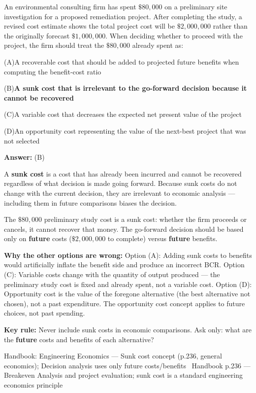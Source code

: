 \documentclass[11pt]{article}
\newcommand{\correct}[1]{\textbf{#1}\;{\color{accent}$\checkmark$}}
\newcommand{\optline}[2]{\par\noindent\hspace{1.2em}(#1)\hspace{0.6em}#2}
\begin{document}
An environmental consulting firm has spent $\$80{,}000$ on a preliminary site investigation for a proposed remediation project. After completing the study, a revised cost estimate shows the total project cost will be $\$2{,}000{,}000$ rather than the originally forecast $\$1{,}000{,}000$. When deciding whether to proceed with the project, the firm should treat the $\$80{,}000$ already spent as:\par\par\vspace{3pt}
\optline{A}{A recoverable cost that should be added to projected future benefits when computing the benefit-cost ratio}
\optline{B}{\correct{A sunk cost that is irrelevant to the go-forward decision because it cannot be recovered}}
\optline{C}{A variable cost that decreases the expected net present value of the project}
\optline{D}{An opportunity cost representing the value of the next-best project that was not selected}
\par\vspace{3pt}
\vspace{2pt}\par\noindent\colorbox{boxbg}{\parbox{\dimexpr\linewidth-2\fboxsep\relax}{%
\vspace{2pt}\textbf{Answer:} (B)\par\vspace{2pt}
{\small A \textbf{sunk cost} is a cost that has already been incurred and cannot be recovered regardless of what decision is made going forward. Because sunk costs do not change with the current decision, they are irrelevant to economic analysis --- including them in future comparisons biases the decision.\par
The $\$80{,}000$ preliminary study cost is a sunk cost: whether the firm proceeds or cancels, it cannot recover that money. The go-forward decision should be based only on \textbf{future} costs ($\$2{,}000{,}000$ to complete) versus \textbf{future} benefits.\par
\textbf{Why the other options are wrong:} Option (A): Adding sunk costs to benefits would artificially inflate the benefit side and produce an incorrect BCR. Option (C): Variable costs change with the quantity of output produced --- the preliminary study cost is fixed and already spent, not a variable cost. Option (D): Opportunity cost is the value of the foregone alternative (the best alternative not chosen), not a past expenditure. The opportunity cost concept applies to future choices, not past spending.\par
\textbf{Key rule:} Never include sunk costs in economic comparisons. Ask only: what are the \textbf{future} costs and benefits of each alternative?\par}\par\vspace{2pt}
{\footnotesize\color{soft}Handbook: Engineering Economics --- Sunk cost concept (p.236, general economics); Decision analysis uses only future costs/benefits \textbullet\ Handbook p.236 --- Breakeven Analysis and project evaluation; sunk cost is a standard engineering economics principle}\vspace{2pt}
}}
\end{document}

